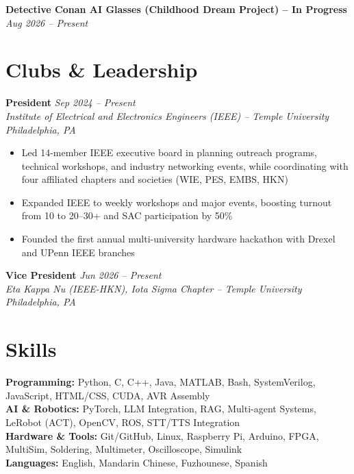 \documentclass[11pt, letterpaper]{article}
\newcommand{\roleentry}[4]{%
    \noindent\textbf{#1} \hfill \textit{#2} \\
    \textit{#3} \hfill \textit{#4}%
    \vspace{0pt}
}
\newcommand{\projectentry}[2]{%
    \noindent\textbf{#1} \hfill \textit{#2}%
    \vspace{0pt}
}
\begin{document}
\vspace{1pt}
\projectentry{Detective Conan AI Glasses (Childhood Dream Project) -- In Progress}{Aug 2026 -- Present}

\vspace{2pt}

\section{Clubs \& Leadership}

\roleentry{President}{Sep 2024 -- Present}%
    {Institute of Electrical and Electronics Engineers (IEEE) -- Temple University}{Philadelphia, PA}
\begin{itemize}
    \item Led 14-member IEEE executive board in planning outreach programs, technical workshops, and industry networking events, while coordinating with four affiliated chapters and societies (WIE, PES, EMBS, HKN)
    \item Expanded IEEE to weekly workshops and major events, boosting turnout from 10 to 20–30+ and SAC participation by 50\%
    \item Founded the first annual multi-university hardware hackathon with Drexel and UPenn IEEE branches
\end{itemize}

\vspace{1pt}
\roleentry{Vice President}{Jun 2026 -- Present}%
    {Eta Kappa Nu (IEEE-HKN), Iota Sigma Chapter -- Temple University}{Philadelphia, PA}

\vspace{2pt}

\section{Skills}

\noindent
\textbf{Programming:} Python, C, C++, Java, MATLAB, Bash, SystemVerilog, JavaScript, HTML/CSS, CUDA, AVR Assembly \\[1pt]
\textbf{AI \& Robotics:} PyTorch, LLM Integration, RAG, Multi-agent Systems, LeRobot (ACT), OpenCV, ROS, STT/TTS Integration \\[1pt]
\textbf{Hardware \& Tools:} Git/GitHub, Linux, Raspberry Pi, Arduino, FPGA, MultiSim, Soldering, Multimeter, Oscilloscope, Simulink\\[1pt]
\textbf{Languages:} English, Mandarin Chinese, Fuzhounese, Spanish
\end{document}
